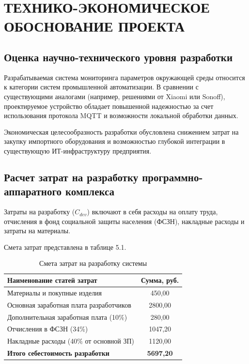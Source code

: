 \chapter{ТЕХНИКО-ЭКОНОМИЧЕСКОЕ ОБОСНОВАНИЕ ПРОЕКТА}

\section{Оценка научно-технического уровня разработки}

Разрабатываемая система мониторинга параметров окружающей среды относится к категории систем промышленной автоматизации. В сравнении с существующими аналогами (например, решениями от Xiaomi или Sonoff), проектируемое устройство обладает повышенной надежностью за счет использования протокола MQTT и возможности локальной обработки данных. 

Экономическая целесообразность разработки обусловлена снижением затрат на закупку импортного оборудования и возможностью глубокой интеграции в существующую ИТ-инфраструктуру предприятия.

\section{Расчет затрат на разработку программно-аппаратного комплекса}

Затраты на разработку ($C_{dev}$) включают в себя расходы на оплату труда, отчисления в фонд социальной защиты населения (ФСЗН), накладные расходы и затраты на материалы.

Смета затрат представлена в таблице 5.1.

\begin{table}[h!]
    \centering
    \caption{Смета затрат на разработку системы}
    \begin{tabular}{|l|c|}
        \hline
        Наименование статей затрат & Сумма, руб. \\ \hline
        Материалы и покупные изделия & 450,00 \\ \hline
        Основная заработная плата разработчиков & 2800,00 \\ \hline
        Дополнительная заработная плата (10\%) & 280,00 \\ \hline
        Отчисления в ФСЗН (34\%) & 1047,20 \\ \hline
        Накладные расходы (40\% от основной ЗП) & 1120,00 \\ \hline
        \textbf{Итого себестоимость разработки} & \textbf{5697,20} \\ \hline
    \end{tabular}
\end{table}

